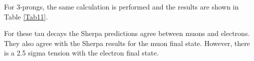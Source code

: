 For 3-prongs, the same calculation is performed and the results are shown in Table \ref{Tab11}.
\begin{table}[]
	\centering
	\caption{MC signal yield comparisons. 3-prong taus.}
	\label{Tab11}
\end{table}
For these tau decays the Sherpa predictions agree between muons and electrons. They also agree with the Sherpa results for the muon final state. However, there is a 2.5 sigma tension with the electron final state.

